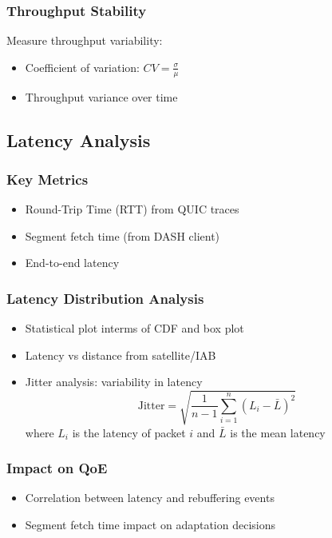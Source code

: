 \documentclass[11pt,a4paper]{article}
\begin{document}
\subsubsection{Throughput Stability}
Measure throughput variability:
\begin{itemize}
    \item Coefficient of variation: $CV = \frac{\sigma}{\mu}$
    \item Throughput variance over time
\end{itemize}

\subsection{Latency Analysis}

\subsubsection{Key Metrics}
\begin{itemize}
    \item Round-Trip Time (RTT) from QUIC traces
    \item Segment fetch time (from DASH client)
    \item End-to-end latency
\end{itemize}

\subsubsection{Latency Distribution Analysis}
\begin{itemize}
    \item Statistical plot interms of CDF and box plot
    \item Latency vs distance from satellite/IAB
    \item Jitter analysis: variability in latency
        \begin{equation}
            \text{Jitter} = \sqrt{\frac{1}{n-1}\sum_{i=1}^{n}(L_i - \bar{L})^2}
        \end{equation}
        where $L_i$ is the latency of packet $i$ and $\bar{L}$ is the mean latency
\end{itemize}

\subsubsection{Impact on QoE}
\begin{itemize}
    \item Correlation between latency and rebuffering events
    \item Segment fetch time impact on adaptation decisions
\end{itemize}
\end{document}

